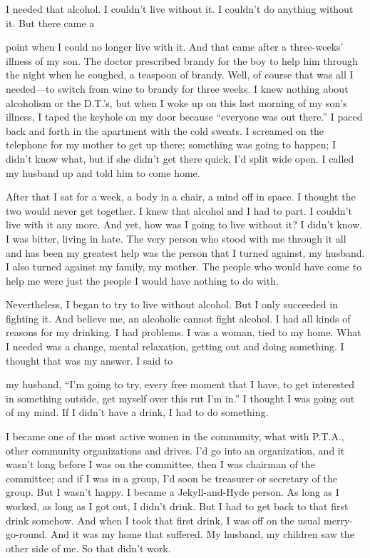 \begin{biblechapter}
I needed that alcohol. I couldn’t live without it. I couldn’t do anything without it. But there came a

point when I could no longer live with it. And that came after a three-weeks’ illness of my son. The doctor prescribed brandy for the boy to help him through the night when he coughed, a teaspoon of brandy. Well, of course that was all I needed—to switch from wine to brandy for three weeks. I knew nothing about alcoholism or the D.T.’s, but when I woke up on this last morning of my son’s illness, I taped the keyhole on my door because “everyone was out there.” I paced back and forth in the apartment with the cold sweats. I screamed on the telephone for my mother to get up there; something was going to happen; I didn’t know what, but if she didn’t get there quick, I’d split wide open. I called my husband up and told him to come home.

After that I sat for a week, a body in a chair, a mind off in space. I thought the two would never get together. I knew that alcohol and I had to part. I couldn’t live with it any more. And yet, how was I going to live without it? I didn’t know. I was bitter, living in hate. The very person who stood with me through it all and has been my greatest help was the person that I turned against, my husband. I also turned against my family, my mother. The people who would have come to help me were just the people I would have nothing to do with.

Nevertheless, I began to try to live without alcohol. But I only succeeded in fighting it. And believe me, an alcoholic cannot fight alcohol. I had all kinds of reasons for my drinking. I had problems. I was a woman, tied to my home. What I needed was a change, mental relaxation, getting out and doing something. I thought that was my answer. I said to

my husband, “I’m going to try, every free moment that I have, to get interested in something outside, get myself over this rut I’m in.” I thought I was going out of my mind. If I didn’t have a drink, I had to do something.

I became one of the most active women in the community, what with P.T.A., other community organizations and drives. I’d go into an organization, and it wasn’t long before I was on the committee, then I was chairman of the committee; and if I was in a group, I’d soon be treasurer or secretary of the group. But I wasn’t happy. I became a Jekyll-and-Hyde person. As long as I worked, as long as I got out, I didn’t drink. But I had to get back to that first drink somehow. And when I took that first drink, I was off on the usual merry-go-round. And it was my home that suffered. My husband, my children saw the other side of me. So that didn’t work.


\end{biblechapter}
